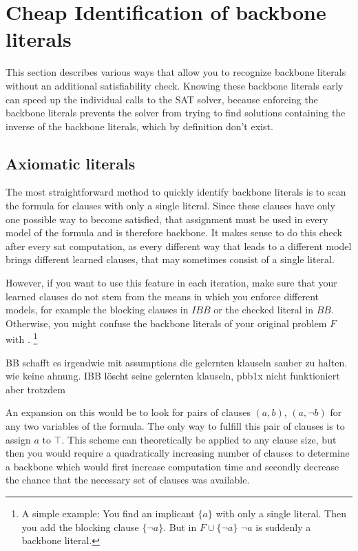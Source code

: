 \section{Cheap Identification of backbone literals}
This section describes various ways that allow you to recognize backbone literals without an additional satisfiability check. Knowing these backbone literals early can speed up the individual calls to the SAT solver, because enforcing the backbone literals prevents the solver from trying to find solutions containing the inverse of the backbone literals, which by definition don't exist.


\subsection{Axiomatic literals}
The most straightforward method to quickly identify backbone literals is to scan the formula for clauses with only a single literal. Since these clauses have only one possible way to become satisfied, that assignment must be used in every model of the formula and is therefore backbone. It makes sense to do this check after every sat computation, as every different way that leads to a different model brings different learned clauses, that may sometimes consist of a single literal.

However, if you want to use this feature in each iteration, make sure that your learned clauses do not stem from the means in which you enforce different models, for example the blocking clauses in $IBB$ or the checked literal in $BB$. Otherwise, you might confuse the backbone literals of your original problem $F$ with . \footnote{A simple example: You find an implicant $\{a\}$ with only a single literal. Then you add the blocking clause $\{\neg a\}$. But in $F \cup \{\neg a\}$ $\neg a$ is suddenly a backbone literal.}

BB schafft es irgendwie mit assumptions die gelernten klauseln sauber zu halten. wie keine ahnung. IBB löscht seine gelernten klauseln, pbb1x nicht funktioniert aber trotzdem

An expansion on this would be to look for pairs of clauses $(a,b)$, $(a,\neg b)$ for any two variables of the formula. The only way to fulfill this pair of clauses is to assign $a$ to $\top$. This scheme can theoretically be applied to any clause size, but then you would require a quadratically increasing number of clauses to determine a backbone which would first increase computation time and secondly decrease the chance that the necessary set of clauses was available.

